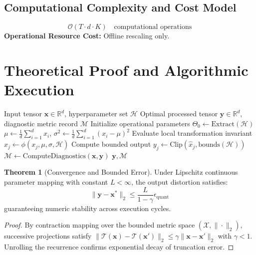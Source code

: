 \documentclass[11pt,a4paper]{article}
\theoremstyle{definition}
\newtheorem{theorem}{\textbf{Theorem}}[section]
\begin{document}
\subsection{Computational Complexity and Cost Model}
\begin{equation}
\mathcal{O}(T \cdot d \cdot K) \quad \text{computational operations}
\end{equation}
\textbf{Operational Resource Cost:} Offline rescaling only.

\section{Theoretical Proof and Algorithmic Execution}

\begin{algorithm}[H]
\caption{SmoothQuant (migrating activation outliers into weights) Operational Pipeline}
\begin{algorithmic}[1]
\Require Input tensor $\mathbf{x} \in \mathbb{R}^d$, hyperparameter set $\mathcal{H}$
\Ensure Optimal processed tensor $\mathbf{y} \in \mathbb{R}^d$, diagnostic metric record $\mathcal{M}$
\State Initialize operational parameters $\Theta_0 \leftarrow \text{Extract}(\mathcal{H})$
\State $\mu \leftarrow \frac{1}{d} \sum_{i=1}^d x_i$, \quad $\sigma^2 \leftarrow \frac{1}{d} \sum_{i=1}^d (x_i - \mu)^2$
    \State Evaluate local transformation invariant $\hat{x}_j \leftarrow \phi(x_j, \mu, \sigma, \mathcal{H})$
    \State Compute bounded output $y_j \leftarrow \text{Clip}(\hat{x}_j, \text{bounds}(\mathcal{H}))$
\EndFor
\State $\mathcal{M} \leftarrow \text{ComputeDiagnostics}(\mathbf{x}, \mathbf{y})$
\State \Return $\mathbf{y}, \mathcal{M}$
\end{algorithmic}
\end{algorithm}

\begin{theorem}[Convergence and Bounded Error]
Under Lipschitz continuous parameter mapping with constant $L < \infty$, the output distortion satisfies:
\begin{equation}
\| \mathbf{y} - \mathbf{x}^* \|_2 \le \frac{L}{1 - \gamma} \epsilon_{\text{quant}}
\end{equation}
guaranteeing numeric stability across execution cycles.
\end{theorem}

\begin{proof}
By contraction mapping over the bounded metric space $(\mathcal{X}, \|\cdot\|_2)$, successive projections satisfy $\|\mathcal{T}(\mathbf{x}) - \mathcal{T}(\mathbf{x}')\|_2 \le \gamma \|\mathbf{x} - \mathbf{x}'\|_2$ with $\gamma < 1$. Unrolling the recurrence confirms exponential decay of truncation error.
\end{proof}
\end{document}
